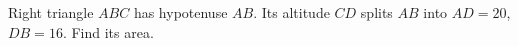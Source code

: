 Right triangle $ABC$ has hypotenuse $AB$. Its altitude $CD$ splits $AB$ into $AD=20$, $DB=16$. Find its area.
